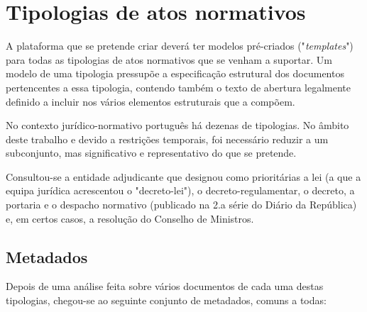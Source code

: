 \chapter{Tipologias de atos normativos}
\label{tipologias}

A plataforma que se pretende criar deverá ter modelos pré-criados ("\emph{templates}") para todas as tipologias de atos normativos 
que se venham a suportar. 
Um modelo de uma tipologia pressupõe a especificação estrutural dos documentos pertencentes a essa tipologia, 
contendo também o texto de abertura legalmente definido a incluir nos vários elementos estruturais que a compõem.

No contexto jurídico-normativo português há dezenas de tipologias. No âmbito deste trabalho e devido a 
restrições temporais, foi necessário reduzir a um subconjunto, mas significativo e representativo 
do que se pretende.

Consultou-se a entidade adjudicante que designou como prioritárias a lei (a que a equipa jurídica acrescentou o "decreto-lei"),
o decreto-regulamentar, o decreto, a portaria e o despacho normativo 
(publicado na 2.a série do Diário da República) e, em certos casos, a resolução do Conselho de Ministros.

\section{Metadados}

Depois de uma análise feita sobre vários documentos de cada uma destas tipologias, chegou-se ao seguinte conjunto
de metadados, comuns a todas:

